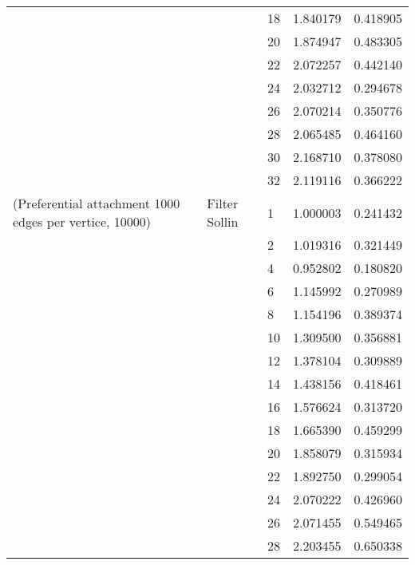 \begin{tabular}{lllrr}
                      &                     & 18 &  1.840179 &  0.418905 \\
                      &                     & 20 &  1.874947 &  0.483305 \\
                      &                     & 22 &  2.072257 &  0.442140 \\
                      &                     & 24 &  2.032712 &  0.294678 \\
                      &                     & 26 &  2.070214 &  0.350776 \\
                      &                     & 28 &  2.065485 &  0.464160 \\
                      &                     & 30 &  2.168710 &  0.378080 \\
                      &                     & 32 &  2.119116 &  0.366222 \\
(Preferential attachment 1000 edges per vertice, 10000) & Filter Sollin & 1  &  1.000003 &  0.241432 \\
                      &                     & 2  &  1.019316 &  0.321449 \\
                      &                     & 4  &  0.952802 &  0.180820 \\
                      &                     & 6  &  1.145992 &  0.270989 \\
                      &                     & 8  &  1.154196 &  0.389374 \\
                      &                     & 10 &  1.309500 &  0.356881 \\
                      &                     & 12 &  1.378104 &  0.309889 \\
                      &                     & 14 &  1.438156 &  0.418461 \\
                      &                     & 16 &  1.576624 &  0.313720 \\
                      &                     & 18 &  1.665390 &  0.459299 \\
                      &                     & 20 &  1.858079 &  0.315934 \\
                      &                     & 22 &  1.892750 &  0.299054 \\
                      &                     & 24 &  2.070222 &  0.426960 \\
                      &                     & 26 &  2.071455 &  0.549465 \\
                      &                     & 28 &  2.203455 &  0.650338 \\

\end{tabular}
